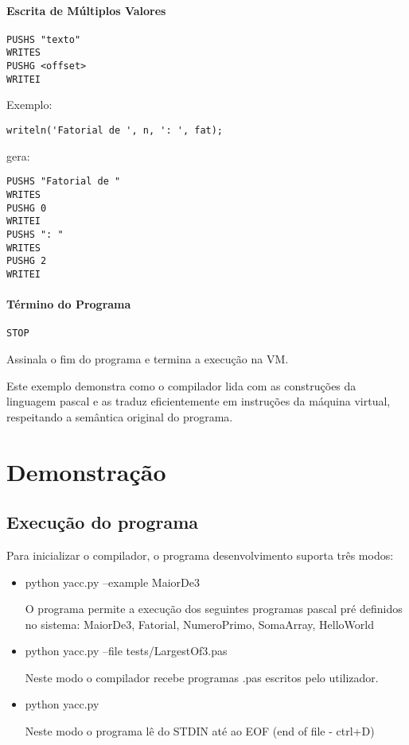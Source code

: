 \documentclass[12pt,a4paper]{report}%
\begin{document}
\subsubsection{Escrita de Múltiplos Valores}

\begin{verbatim}
PUSHS "texto"
WRITES
PUSHG <offset>
WRITEI
\end{verbatim}

Exemplo:
\begin{verbatim}
writeln('Fatorial de ', n, ': ', fat);
\end{verbatim}
gera:
\begin{verbatim}
PUSHS "Fatorial de "
WRITES
PUSHG 0
WRITEI
PUSHS ": "
WRITES
PUSHG 2
WRITEI
\end{verbatim}

\subsubsection{Término do Programa}

\begin{verbatim}
STOP
\end{verbatim}

Assinala o fim do programa e termina a execução na VM.

Este exemplo demonstra como o compilador lida com as construções da linguagem pascal e as traduz eficientemente em instruções da máquina virtual, respeitando a semântica original do programa.

\chapter{Demonstração}

\section{Execução do programa}

Para inicializar o compilador, o programa desenvolvimento suporta três modos:
\begin{itemize}
    \item python yacc.py --example MaiorDe3
    
        O programa permite a execução dos seguintes programas pascal pré definidos no sistema: MaiorDe3, Fatorial, NumeroPrimo, SomaArray, HelloWorld

    \item python yacc.py --file tests/LargestOf3.pas

        Neste modo o compilador recebe programas .pas escritos pelo utilizador.

    \item python yacc.py

        Neste modo o programa lê do STDIN até ao EOF (end of file - ctrl+D)
    
\end{itemize}
\end{document}
